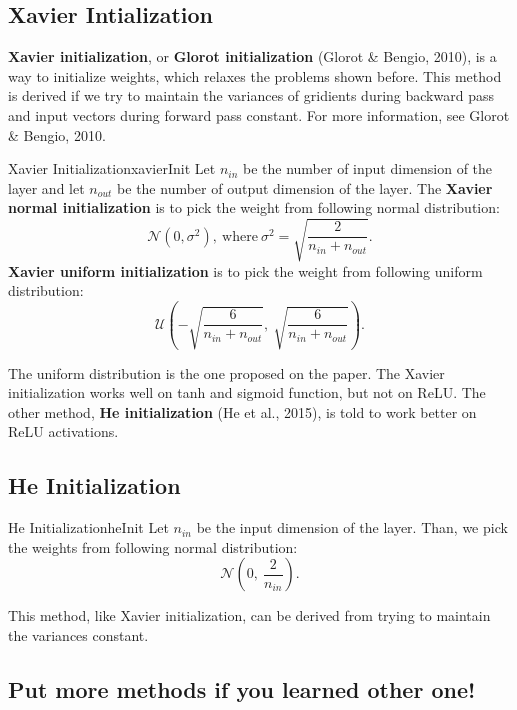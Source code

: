 \documentclass{article}
\begin{document}
    \subsection{Xavier Intialization}
        \textbf{Xavier initialization}, or \textbf{Glorot initialization} (Glorot \& Bengio, 2010), is a way to initialize weights,
        which relaxes the problems shown before. This method is derived if we try to maintain the variances of gridients during backward pass
        and input vectors during forward pass constant. For more information, see Glorot \& Bengio, 2010.
        \begin{defn}{Xavier Initialization}{xavierInit}
            Let $n_{in}$ be the number of input dimension of the layer and let $n_{out}$ be the number of output dimension of the layer.
            The \textbf{Xavier normal initialization} is to pick the weight from following normal distribution:
            \[
            \mathcal{N}(0, \sigma^2),\ \text{where}\ \sigma^2 = \sqrt{\frac{2}{n_{in}+n_{out}}}.
            \]
            \textbf{Xavier uniform initialization} is to pick the weight from following uniform distribution:
            \[
            \mathcal{U}\left(-\sqrt{\frac{6}{n_{in}+n_{out}}},\ \sqrt{\frac{6}{n_{in}+n_{out}}}\right).
            \]
        \end{defn}
        The uniform distribution is the one proposed on the paper. The Xavier initialization works well on tanh and sigmoid function, but not on
        ReLU. The other method, \textbf{He initialization} (He et al., 2015), is told to work better on ReLU activations.

    \subsection{He Initialization}
        \begin{defn}{He Initialization}{heInit}
            Let $n_{in}$ be the input dimension of the layer. Than, we pick the weights from following normal distribution:
            \[
            \mathcal{N}\left(0,\ \frac{2}{n_{in}}\right).
            \]
        \end{defn}
        This method, like Xavier initialization, can be derived from trying to maintain the variances constant.
    
    \subsection{Put more methods if you learned other one!}
\end{document}
